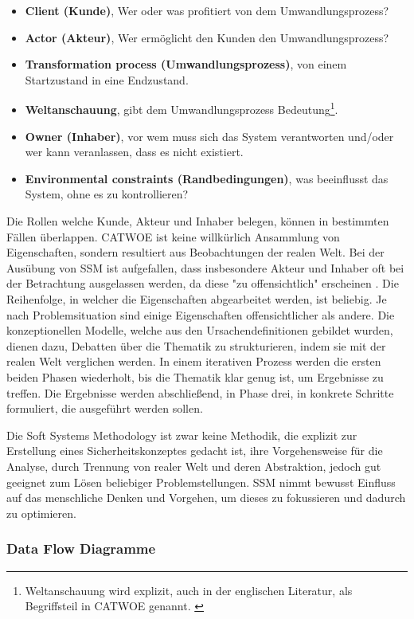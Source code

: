 \documentclass[11pt,a4paper]{report}
\begin{document}
\begin{itemize}[leftmargin=*]
\item \textbf{Client (Kunde)}, Wer oder was profitiert von dem Umwandlungsprozess?
\item \textbf{Actor (Akteur)}, Wer ermöglicht den Kunden den Umwandlungsprozess?
\item \textbf{Transformation process (Umwandlungsprozess)}, von einem Startzustand in eine Endzustand.
\item \textbf{Weltanschauung}, gibt dem Umwandlungsprozess Bedeutung\footnote{Weltanschauung wird explizit, auch in der englischen Literatur, als Begriffsteil in CATWOE genannt. \cite[s.~255]{gutmann}}.
\item \textbf{Owner (Inhaber)}, vor wem muss sich das System verantworten und/oder wer kann veranlassen, dass es nicht existiert.
\item \textbf{Environmental constraints (Randbedingungen)}, was beeinflusst das System, ohne es zu kontrollieren?
\end{itemize}

Die Rollen welche Kunde, Akteur und Inhaber belegen, können in bestimmten Fällen überlappen. CATWOE ist keine willkürlich Ansammlung von Eigenschaften, sondern resultiert aus Beobachtungen der realen Welt. Bei der Ausübung von SSM ist aufgefallen, dass insbesondere Akteur und Inhaber oft bei der Betrachtung ausgelassen werden, da diese "zu offensichtlich" erscheinen \cite[s.~255]{gutmann}. Die Reihenfolge, in welcher die Eigenschaften abgearbeitet werden, ist beliebig. Je nach Problemsituation sind einige Eigenschaften offensichtlicher als andere. Die konzeptionellen Modelle, welche aus den Ursachendefinitionen gebildet wurden, dienen dazu, Debatten über die Thematik zu strukturieren, indem sie mit der realen Welt verglichen werden. In einem iterativen Prozess werden die ersten beiden Phasen wiederholt, bis die Thematik klar genug ist, um Ergebnisse zu treffen. Die Ergebnisse werden abschließend, in Phase drei, in konkrete Schritte formuliert, die ausgeführt werden sollen.

Die Soft Systems Methodology ist zwar keine Methodik, die explizit zur Erstellung eines Sicherheitskonzeptes gedacht ist, ihre Vorgehensweise für die Analyse, durch Trennung von realer Welt und deren Abstraktion, jedoch gut geeignet zum Lösen beliebiger Problemstellungen. SSM nimmt bewusst Einfluss auf das menschliche Denken und Vorgehen, um dieses zu fokussieren und dadurch zu optimieren.

\subsubsection{Data Flow Diagramme}
\end{document}
